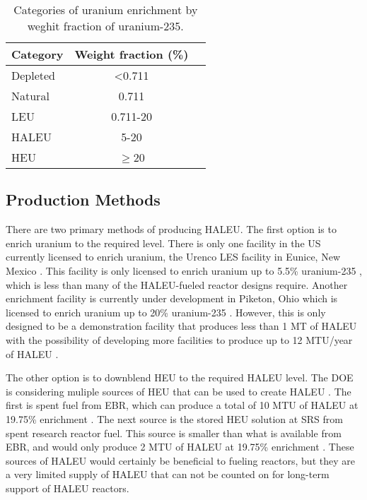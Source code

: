 \begin{table}
    \centering
    \caption{Categories of uranium enrichment by weghit fraction of 
    uranium-235.}
    \label{tab:enrichemnt}
    \begin{tabular}{l c c}
        \hline
        Category & Weight fraction (\%)\\\hline
        Depleted & <0.711 \\
        Natural & 0.711 \\
        \gls{LEU} & 0.711-20 \\
        \gls{HALEU} & 5-20 \\
        \gls{HEU} & $\ge$20 \\
        \hline
    \end{tabular}
\end{table}

\subsection{Production Methods}
There are two primary methods of producing \gls{HALEU}. The first 
option is to enrich uranium to the required level. There is only one 
facility in the US currently 
licensed to enrich uranium, the Urenco LES facility in Eunice, 
New Mexico \cite{noauthor_establishing_2022}. This facility is only 
licensed to enrich uranium up to 5.5\% uranium-235 \cite{noauthor_establishing_2022},
which is less than many of the \gls{HALEU}-fueled reactor designs 
require. Another enrichment facility is currently under development in 
Piketon, Ohio which is licensed to enrich uranium up to 20\% 
uranium-235 \cite{noauthor_establishing_2022}. However, this is only 
designed to be a demonstration facility that produces less than 1 MT of 
\gls{HALEU} \cite{noauthor_establishing_2022} with the possibility of 
developing more facilities to produce up to 12 MTU/year of \gls{HALEU}
\cite{noauthor_establishing_2022}.

The other option is to downblend \gls{HEU} to the required \gls{HALEU}
level. The \gls{DOE} is considering muliple sources of \gls{HEU} that can 
be used to create \gls{HALEU} \cite{noauthor_establishing_2022}. The 
first is spent fuel from \gls{EBR}, which can produce a total of 10 MTU 
of \gls{HALEU} at 19.75\% enrichment \cite{noauthor_establishing_2022}. 
The next source is the stored \gls{HEU} solution at \gls{SRS} from 
spent research reactor fuel. This source is smaller than what is 
available from \gls{EBR}, and would only produce 2 MTU of \gls{HALEU} 
at 19.75\% enrichment \cite{noauthor_establishing_2022}. These sources of 
\gls{HALEU} would certainly be beneficial to fueling reactors, but they 
are a very limited supply of \gls{HALEU} that can not be counted on 
for long-term support of \gls{HALEU} reactors. 


